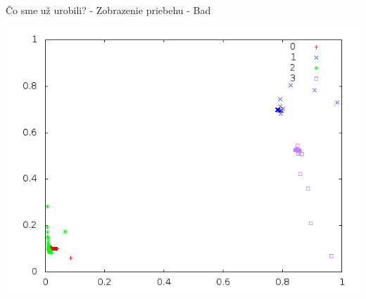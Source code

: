 \documentclass[xcolor=dvipsnames]{beamer}
\begin{document}
\begin{frame}{Čo sme už urobili? - Zobrazenie priebehu - Bad}
    \begin{center}
      \includegraphics[scale=0.5]{img/close.png}
    \end{center} 
\end{frame}

\end{document}
